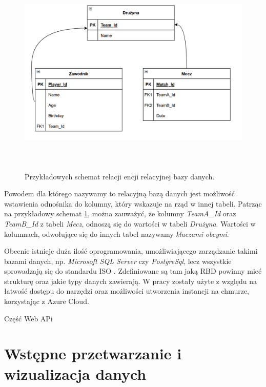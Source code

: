 \begin{figure}[h] 
        \centering\includegraphics[width=14cm,height=10cm]{figures/Example_entities.PNG}
        \caption{Przykładowych schemat relacji encji relacyjnej bazy danych.}\label{example-Entity}
\end{figure}

Powodem dla którego nazywamy to relacyjną bazą danych jest możliwość wstawienia odnośnika do kolumny, który wskazuje na rząd w innej tabeli. Patrząc na przykładowy schemat \ref{example-Entity}, można zauważyć, że kolumny \textit{TeamA\_Id} oraz \textit{TeamB\_Id} z tabeli \textit{Mecz}, odnoszą się do wartości w tabeli \textit{Drużyna}. Wartości w kolumnach, odwołujące się do innych tabel nazywamy \textit{kluczami obcymi}. \cite{Relational_Databases_Milan}

Obecnie istnieje duża ilość oprogramowania, umożliwiającego zarządzanie takimi bazami danych, np. \textit{Microsoft SQL Server} czy \textit{PostgreSql}, lecz wszystkie sprowadzają się do standardu ISO \cite{SQL_ISO}. Zdefiniowane są tam jaką RBD powinny mieć strukturę oraz jakie typy danych zawierają. W pracy zostały użyte z względu na łatwość dostępu do narzędzi oraz możliwości utworzenia instancji na chmurze, korzystając z Azure Cloud.

Część Web APi

\section{Wstępne przetwarzanie i wizualizacja danych}

\noindent 

